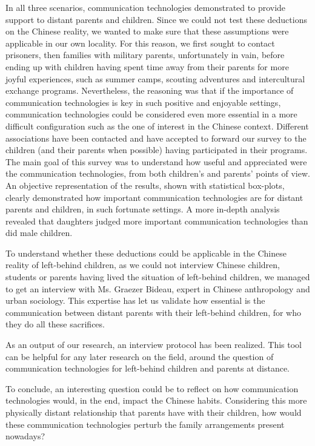 In all three scenarios, communication technologies demonstrated to provide support to distant parents and children. Since we could not test these deductions on the Chinese reality, we wanted to make sure that these assumptions were applicable in our own locality. For this reason, we first sought to contact prisoners, then families with military parents, unfortunately in vain, before ending up with children having spent time away from their parents for more joyful experiences, such as summer camps, scouting adventures and intercultural exchange programs. Nevertheless, the reasoning was that if the importance of communication technologies is key in such positive and enjoyable settings, communication technologies could be considered even more essential in a more difficult configuration such as the one of interest in the Chinese context. Different associations have been contacted and have accepted to forward our survey to the children (and their parents when possible) having participated in their programs. The main goal of this survey was to understand how useful and appreciated were the communication technologies, from both children's and parents' points of view. An objective representation of the results, shown with statistical box-plots, clearly demonstrated how important communication technologies  are for distant parents and children, in such fortunate settings. A more in-depth analysis revealed that daughters judged more important communication technologies than did male children. 

To understand whether these deductions could be applicable in the Chinese reality of left-behind children, as we could not interview Chinese children, students or parents having lived the situation of left-behind children, we managed to get an interview with Ms. Graezer Bideau, expert in Chinese anthropology and urban sociology. This expertise has let us validate how essential is the communication between distant parents with their left-behind children, for who they do all these sacrifices. 

As an output of our research, an interview protocol has been realized. This tool can be helpful for any later research on the field, around the question of communication technologies for left-behind children and parents at distance. 

To conclude, an interesting question could be to reflect on how communication technologies would, in the end, impact the Chinese habits. Considering this more physically distant relationship that parents have with their children, how would these communication technologies perturb the family arrangements present nowadays?
